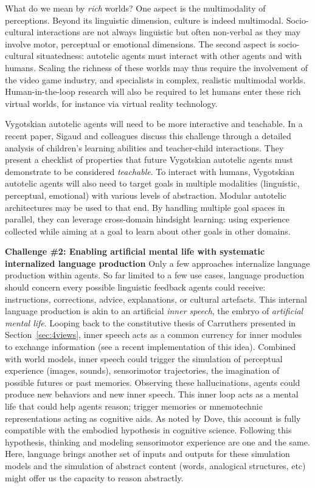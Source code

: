 What do we mean by \textit{rich} worlds? One aspect is the multimodality of perceptions. Beyond its linguistic dimension, culture is indeed multimodal. Socio-cultural interactions are not always linguistic but often non-verbal as they may involve motor, perceptual or emotional dimensions. The second aspect is socio-cultural situatedness: autotelic agents must interact with other agents and with humans. Scaling the richness of these worlds may thus require the involvement of the video game industry, and specialists in complex, realistic multimodal worlds. Human-in-the-loop research will also be required to let humans enter these rich virtual worlds, for instance via virtual reality technology. 

Vygotskian autotelic agents will need to be more interactive and teachable. In a recent paper, Sigaud and colleagues discuss this challenge through a detailed analysis of children's learning abilities and teacher-child interactions.\cite{sigaud_towards_2021} They present a checklist of properties that future Vygotskian autotelic agents must demonstrate to be considered \textit{teachable}. To interact with humans, Vygotskian autotelic agents will also need to target goals in multiple modalities (\eg linguistic, perceptual, emotional) with various levels of abstraction.\cite{colas2021intrinsically} Modular autotelic architectures may be used to that end. By handling multiple goal spaces in parallel, they can leverage cross-domain hindsight learning: using experience collected while aiming at a goal to learn about other goals in other domains.\cite{curious} 

\textbf{Challenge \#2: Enabling artificial mental life with systematic internalized language production}
Only a few approaches internalize language production within agents. So far limited to a few use cases, language production should concern every possible linguistic feedback agents could receive: instructions, corrections, advice, explanations, or cultural artefacts. This internal language production is akin to an artificial \textit{inner speech}, the embryo of \textit{artificial mental life}. Looping back to the constitutive thesis of Carruthers presented in Section~\ref{sec:4views}, inner speech acts as a common currency for inner modules to exchange information (see a recent implementation of this idea\cite{zeng2022socratic}). Combined with world models, inner speech could trigger the simulation of perceptual experience (images, sounds), sensorimotor trajectories, the imagination of possible futures or past memories. Observing these hallucinations, agents could produce new behaviors and new inner speech. This inner loop acts as a mental life that could help agents reason; trigger memories or mnemotechnic representations acting as cognitive aids. As noted by Dove, this account is fully compatible with the embodied hypothesis in cognitive science.\cite{dove_language_2018} Following this hypothesis, thinking and modeling sensorimotor experience are one and the same. Here, language brings another set of inputs and outputs for these simulation models and the simulation of abstract content (words, analogical structures, etc) might offer us the capacity to reason abstractly.  

